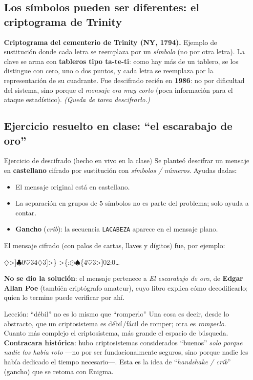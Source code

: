 \documentclass[11pt,a4paper]{article}
\begin{document}
\subsection{Los símbolos pueden ser diferentes: el criptograma de Trinity}
\begin{notebox}
\textbf{Criptograma del cementerio de Trinity (NY, 1794).} Ejemplo de sustitución donde cada
letra se reemplaza por un \emph{símbolo} (no por otra letra). La clave se arma con
\textbf{tableros tipo ta-te-ti}: como hay más de un tablero, se los distingue con cero, uno o
dos puntos, y cada letra se reemplaza por la representación de su cuadrante. Fue descifrado
recién en \textbf{1986}: no por dificultad del sistema, sino porque el \emph{mensaje era muy
corto} (poca información para el ataque estadístico). \emph{(Queda de tarea descifrarlo.)}
\end{notebox}

\subsection{Ejercicio resuelto en clase: ``el escarabajo de oro''}
\begin{practbox}{Ejercicio de descifrado (hecho en vivo en la clase)}
Se planteó descifrar un mensaje en \textbf{castellano} cifrado por sustitución con
\emph{símbolos / números}. Ayudas dadas:
\begin{itemize}[leftmargin=1.3em,itemsep=1pt]
  \item El mensaje original está en castellano.
  \item La separación en grupos de 5 símbolos no es parte del problema; solo ayuda a contar.
  \item \textbf{Gancho} (\emph{crib}): la secuencia \texttt{LACABEZA} aparece en el mensaje
        plano.
\end{itemize}
El mensaje cifrado (con palos de cartas, llaves y dígitos) fue, por ejemplo:
\begin{center}\ttfamily\small
$\diamondsuit$>]$\clubsuit$0\quad $\heartsuit$34$\diamondsuit$3]>\}\quad
>\{:$\odot$$\spadesuit$\quad \{4$\heartsuit$3>]02:0\quad \dots
\end{center}
\textbf{No se dio la solución}: el mensaje pertenece a \emph{El escarabajo de oro}, de
\textbf{Edgar Allan Poe} (también criptógrafo amateur), cuyo libro explica cómo decodificarlo;
quien lo termine puede verificar por ahí.
\end{practbox}

\begin{warnbox}{Lección: ``débil'' no es lo mismo que ``romperlo''}
Una cosa es decir, desde lo abstracto, que un criptosistema es débil/fácil de romper; otra es
\emph{romperlo}. Cuanto más complejo el criptosistema, más grande el espacio de búsqueda.
\textbf{Contracara histórica}: hubo criptosistemas considerados ``buenos'' \emph{solo porque
nadie los había roto} —no por ser fundacionalmente seguros, sino porque nadie les había
dedicado el tiempo necesario—. Esta es la idea de ``\emph{handshake / crib}'' (gancho) que se
retoma con Enigma.
\end{warnbox}
\end{document}
